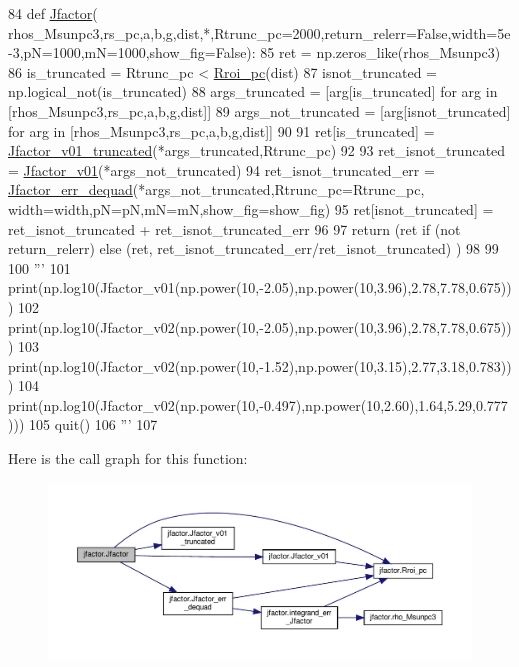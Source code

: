 \begin{DoxyCode}
84 \textcolor{keyword}{def }\hyperlink{namespacejfactor_a3261c30e40781120e1cacf7721893cb7}{Jfactor}(
      rhos\_Msunpc3,rs\_pc,a,b,g,dist,*,Rtrunc\_pc=2000,return\_relerr=False,width=5e-3,pN=1000,mN=1000,show\_fig=False):
85     ret = np.zeros\_like(rhos\_Msunpc3)
86     is\_truncated = Rtrunc\_pc < \hyperlink{namespacejfactor_ae5aad7f2ac90b82740c027677d7f4ac7}{Rroi\_pc}(dist)
87     isnot\_truncated = np.logical\_not(is\_truncated)
88     args\_truncated = [arg[is\_truncated] \textcolor{keywordflow}{for} arg \textcolor{keywordflow}{in} [rhos\_Msunpc3,rs\_pc,a,b,g,dist]]
89     args\_not\_truncated = [arg[isnot\_truncated] \textcolor{keywordflow}{for} arg \textcolor{keywordflow}{in} [rhos\_Msunpc3,rs\_pc,a,b,g,dist]]
90     
91     ret[is\_truncated]  = \hyperlink{namespacejfactor_afd0f5558d89189557900a6a1503261b3}{Jfactor\_v01\_truncated}(*args\_truncated,Rtrunc\_pc)
92     
93     ret\_isnot\_truncated = \hyperlink{namespacejfactor_aeb50ca469052983461a3e8382cfb4f95}{Jfactor\_v01}(*args\_not\_truncated)
94     ret\_isnot\_truncated\_err = \hyperlink{namespacejfactor_a4d9eb98f6dca866cd6248ef6b1c308a5}{Jfactor\_err\_dequad}(*args\_not\_truncated,Rtrunc\_pc=Rtrunc\_pc,
      width=width,pN=pN,mN=mN,show\_fig=show\_fig)
95     ret[isnot\_truncated] = ret\_isnot\_truncated + ret\_isnot\_truncated\_err
96     
97     \textcolor{keywordflow}{return} (ret \textcolor{keywordflow}{if} (\textcolor{keywordflow}{not} return\_relerr) \textcolor{keywordflow}{else} (ret, ret\_isnot\_truncated\_err/ret\_isnot\_truncated) )
98 
99 
100 \textcolor{stringliteral}{'''}
101 \textcolor{stringliteral}{print(np.log10(Jfactor\_v01(np.power(10,-2.05),np.power(10,3.96),2.78,7.78,0.675)))}
102 \textcolor{stringliteral}{print(np.log10(Jfactor\_v02(np.power(10,-2.05),np.power(10,3.96),2.78,7.78,0.675)))}
103 \textcolor{stringliteral}{print(np.log10(Jfactor\_v02(np.power(10,-1.52),np.power(10,3.15),2.77,3.18,0.783)))}
104 \textcolor{stringliteral}{print(np.log10(Jfactor\_v02(np.power(10,-0.497),np.power(10,2.60),1.64,5.29,0.777)))}
105 \textcolor{stringliteral}{quit()}
106 \textcolor{stringliteral}{'''}
107 
\end{DoxyCode}
Here is the call graph for this function\+:\nopagebreak
\begin{figure}[H]
\begin{center}
\leavevmode
\includegraphics[width=350pt]{de/d47/namespacejfactor_a3261c30e40781120e1cacf7721893cb7_cgraph}
\end{center}
\end{figure}
\mbox{\label{namespacejfactor_ad8b8ed7dec1d2c3b4432d37e53117f03}} 

